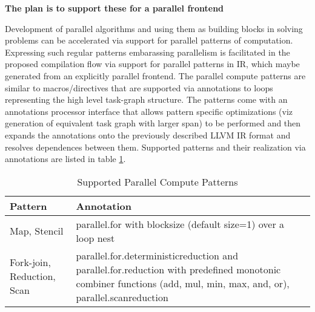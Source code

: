 \textbf{The plan is to support these for a parallel frontend}

Development of parallel algorithms and using them as building blocks in solving problems can be accelerated via support for parallel patterns of computation. Expressing such regular patterns embarassing parallelism is facilitated in the proposed compilation flow via support for parallel patterns in IR, which maybe generated from an explicitly parallel frontend. The parallel compute patterns are similar to macros/directives that are supported via annotations to loops representing the high level task-graph structure. The patterns come with an annotations processor interface that allows pattern specific optimizations (viz generation of equivalent task graph with larger span) to be performed and then expands the annotations onto the previously described LLVM IR format and resolves dependences between them. Supported patterns and their realization via annotations are listed in table \ref{tab_list_patterns}.
\begin{table}[htp]
\caption{Supported Parallel Compute Patterns}
\label{tab_list_patterns}
\centering
    \begin{tabular}{|p{6cm} | p{6cm}|}
    \hline 
    \textbf{Pattern} & \textbf{Annotation} \\\hline \hline
     Map, Stencil & parallel.for with blocksize (default size=1) over a loop nest \\ \hline
     Fork-join, Reduction, Scan  & parallel.for.deterministicreduction and parallel.for.reduction with predefined monotonic combiner functions (add, mul, min, max, and, or), parallel.scanreduction \\ \hline 
     \end{tabular}
\end{table}

% 
